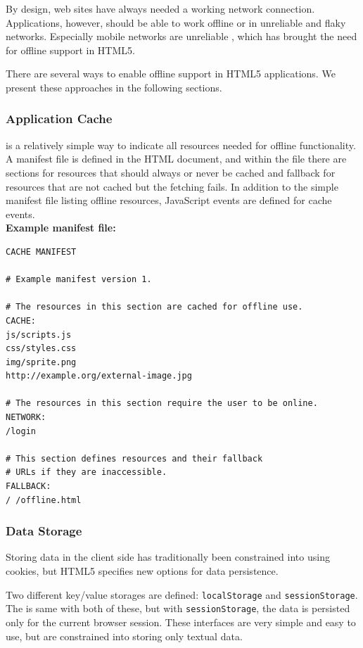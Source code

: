 By design, web sites have always needed a working network
connection. Applications, however, should be able to work offline or
in unreliable and flaky networks. Especially mobile networks are
unreliable \citationneeded, which has brought the need for offline
support in HTML5.

There are several ways to enable offline support in HTML5
applications. We present these approaches in the following sections.

\subsubsection{Application Cache}

 is a relatively simple way to indicate all resources
needed for offline functionality. A manifest file is defined in the
HTML document, and within the file there are sections for resources
that should always or never be cached and fallback  for
resources that are not cached but the fetching fails. In addition to
the simple manifest file listing offline resources, JavaScript events
are defined for cache events.\cite{HTML5draft} \\

\noindent \textbf{Example manifest file:}
\begin{verbatim}
CACHE MANIFEST

# Example manifest version 1.

# The resources in this section are cached for offline use.
CACHE:
js/scripts.js
css/styles.css
img/sprite.png
http://example.org/external-image.jpg

# The resources in this section require the user to be online.
NETWORK:
/login

# This section defines resources and their fallback
# URLs if they are inaccessible.
FALLBACK:
/ /offline.html
\end{verbatim}

\subsubsection{Data Storage}

Storing data in the client side has traditionally been constrained
into using cookies, but HTML5 specifies new options for data
persistence.

Two different key/value storages are defined: \texttt{localStorage}
and \texttt{sessionStorage}. The  is same with both of
these, but with \texttt{sessionStorage}, the data is persisted only
for the current browser session. These interfaces are very simple and
easy to use, but are constrained into storing only textual
data. \cite{webstoragedraft}

